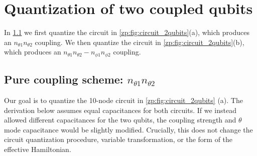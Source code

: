 \section{Quantization of two coupled \texorpdfstring{\zp}{zero-pi} qubits }\label{zp:app:quantize}

In \cref{zp:app:coupling_scheme_theta} we first quantize the circuit in \cref{zp:fig:circuit_2qubits}(a), which produces an  $ n_{\theta1} n_{\theta 2} $ coupling.
We then quantize the circuit in \cref{zp:fig:circuit_2qubits}(b), which produces an  $ n_{\theta1}n_{\theta2} - n_{\phi1}n_{\phi2} $  coupling.

\subsection{Pure coupling scheme: \texorpdfstring{$ n_{\theta1} n_{\theta 2} $} {theta} }\label{zp:app:coupling_scheme_theta}

Our goal is to quantize the 10-node circuit in \cref{zp:fig:circuit_2qubits} (a).
The derivation below assumes equal capacitances for both \zps circuits.
If we instead allowed different capacitances for the two qubits, the coupling strength and $\theta$ mode capacitance would be slightly modified.
Crucially, this does not change the circuit quantization procedure, variable transformation, or the form of the effective Hamiltonian.

